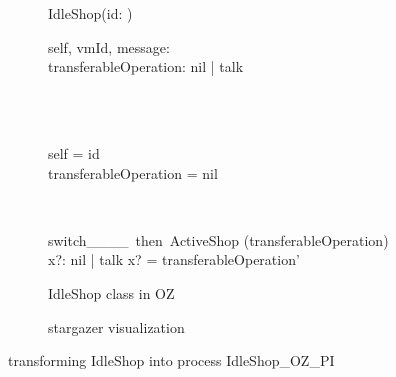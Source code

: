 \begin{figure}[H]
\begin{subfigure}{.6\textwidth}
\centering
\begin{class}{IdleShop(id: \integer)}
\\
\begin{state}
self, vmId, message: \integer
\\transferableOperation: nil | talk
\end{state} 
\\
\begin{init}
\\self = id
\\transferableOperation = nil
\end{init} 
\\
\begin{op}{switch\_\_\_\_\ then\ ActiveShop}
\Delta (transferableOperation)
\\x?: nil | talk
\ST
x? = transferableOperation'
\end{op}
\end{class}
  \caption{IdleShop class in OZ}
\end{subfigure}%
\begin{subfigure}{.4\textwidth}
  \centering
{}
  \caption{stargazer visualization}
\end{subfigure}
\caption{transforming IdleShop into \picalc{} process IdleShop\_OZ\_PI}
\label{tra_idleShop_OZ}
\end{figure}

